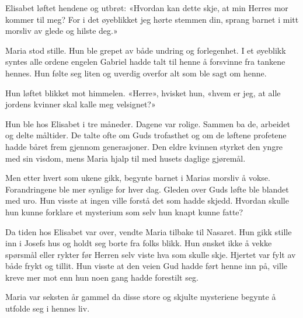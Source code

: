 Elisabet løftet hendene og utbrøt:
«Hvordan kan dette skje, at min Herres mor kommer til meg?
For i det øyeblikket jeg hørte stemmen din,
sprang barnet i mitt morsliv av glede og hilste deg.»

Maria stod stille. Hun ble grepet av både undring og forlegenhet.
I et øyeblikk syntes alle ordene engelen Gabriel
hadde talt til henne å forsvinne fra tankene hennes.
Hun følte seg liten og uverdig overfor alt som ble sagt om henne.

Hun løftet blikket mot himmelen.
«Herre», hvisket hun, «hvem er jeg, at alle jordens
kvinner skal kalle meg velsignet?»

Hun ble hos Elisabet i tre måneder.
Dagene var rolige. Sammen ba de, arbeidet og delte måltider.
De talte ofte om Guds trofasthet og om de løftene profetene
hadde båret frem gjennom generasjoner. Den eldre kvinnen
styrket den yngre med sin visdom, mens Maria hjalp til med
husets daglige gjøremål.

Men etter hvert som ukene gikk, begynte barnet i Marias morsliv å vokse.
Forandringene ble mer synlige for hver dag.
Gleden over Guds løfte ble blandet med uro.
Hun visste at ingen ville forstå det som hadde skjedd.
Hvordan skulle hun kunne forklare et mysterium som selv hun knapt kunne fatte?

Da tiden hos Elisabet var over, vendte Maria tilbake til Nasaret.
Hun gikk stille inn i Josefs hus og holdt seg borte fra folks blikk.
Hun ønsket ikke å vekke spørsmål eller rykter før
Herren selv viste hva som skulle skje. Hjertet var fylt av både
frykt og tillit. Hun visste at den veien Gud hadde ført henne inn på,
ville kreve mer mot enn hun noen gang hadde forestilt seg.

Maria var seksten år gammel da disse store og
skjulte mysteriene begynte å utfolde seg i hennes liv.


